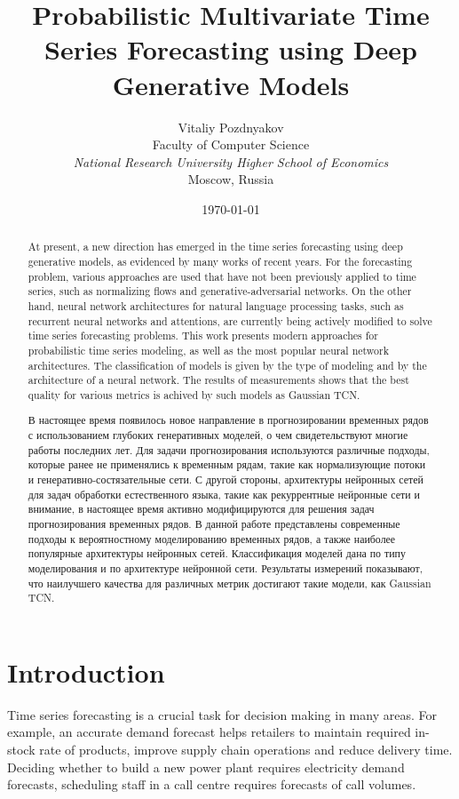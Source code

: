 \documentclass[12pt,a4paper]{article}
\title{Probabilistic Multivariate Time Series Forecasting using Deep Generative Models}
\date{\today}
\author{
    \small Vitaliy Pozdnyakov \\
    \small Faculty of Computer Science \\
    \small \textit{National Research University Higher School of Economics} \\
    \small Moscow, Russia\\
    }
\begin{document}
\begin{abstract}
At present, a new direction has emerged in the time series forecasting using deep generative models, as evidenced by many works of recent years. For the forecasting problem, various approaches are used that have not been previously applied to time series, such as normalizing flows and generative-adversarial networks. On the other hand, neural network architectures for natural language processing tasks, such as recurrent neural networks and attentions, are currently being actively modified to solve time series forecasting problems. This work presents modern approaches for probabilistic time series modeling, as well as the most popular neural network architectures. The classification of models is given by the type of modeling and by the architecture of a neural network. The results of measurements shows that the best quality for various metrics is achived by such models as Gaussian TCN.
\end{abstract}
\begin{abstract}
В настоящее время появилось новое направление в прогнозировании временных рядов с использованием глубоких генеративных моделей, о чем свидетельствуют многие работы последних лет. Для задачи прогнозирования используются различные подходы, которые ранее не применялись к временным рядам, такие как нормализующие потоки и генеративно-состязательные сети. С другой стороны, архитектуры нейронных сетей для задач обработки естественного языка, такие как рекуррентные нейронные сети и внимание, в настоящее время активно модифицируются для решения задач прогнозирования временных рядов. В данной работе представлены современные подходы к вероятностному моделированию временных рядов, а также наиболее популярные архитектуры нейронных сетей. Классификация моделей дана по типу моделирования и по архитектуре нейронной сети. Результаты измерений показывают, что наилучшего качества для различных метрик достигают такие модели, как Gaussian TCN.
\end{abstract}

\newpage

\tableofcontents

\newpage

\section{Introduction}

Time series forecasting is a crucial task for decision making in many areas. For example, an accurate demand forecast helps retailers to maintain required in-stock rate of products, improve supply chain operations and reduce delivery time. Deciding whether to build a new power plant requires electricity demand forecasts, scheduling staff in a call centre requires forecasts of call volumes. 
\end{document}
